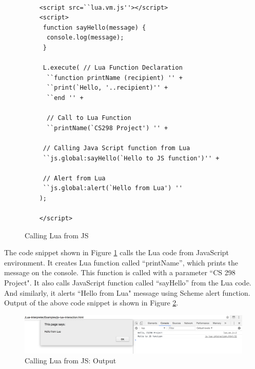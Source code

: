 \begin{figure}[H]
	\begin{lstlisting}[frame=single, style=base]

	<script src=``lua.vm.js''></script>
	<script>
	 function sayHello(message) {
	  console.log(message);
	 }
	
	 L.execute( // Lua Function Declaration
	  ``function printName (recipient) '' +
	  ``print(`Hello, '..recipient)'' +
	  ``end '' +
	
	  // Call to Lua Function
	  ``printName(`CS298 Project') '' +
	
	 // Calling Java Script function from Lua 
	 ``js.global:sayHello(`Hello to JS function')'' +
	
	 // Alert from Lua 
	 ``js.global:alert(`Hello from Lua') ''
	); 

	</script>
	\end{lstlisting}
	\caption{Calling Lua from JS}
	\label{fig:callingluafromjs}
\end{figure}


The code snippet shown in Figure \ref{fig:callingluafromjs} calls the Lua code from JavaScript environment. It creates Lua function called ``printName'', which prints the message on the console. This function is called with a parameter ``CS 298 Project". It also calls JavaScript function called ``sayHello'' from the Lua code. And similarly, it alerts ``Hello from Lua" message using Scheme alert function. Output of the above code snippet is shown in Figure \ref{fig:js-to-lua-interaction}.

\begin{figure}[H]
	\begin{center}
		\includegraphics[width=\linewidth]{./images/js-to-lua-interaction.png}
	\end{center}
	\caption{Calling Lua from JS: Output}
	\label{fig:js-to-lua-interaction}
\end{figure}


